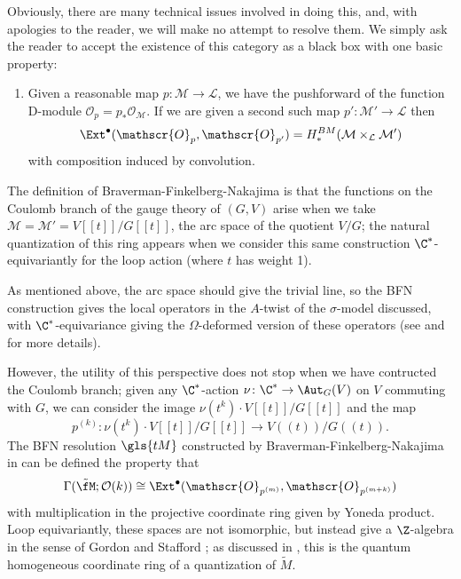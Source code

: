Obviously, there
are many technical issues involved in doing this, and, with apologies
to the reader, we will make no attempt to resolve them.
We simply
ask the reader to accept the existence of this category as a black box
with one basic property:
\begin{enumerate}
\item Given a reasonable map $p\colon \mathcal{M}\to \mathcal{L}$, we
  have the pushforward of the function D-module
  $\mathscr{O}_p=p_*\mathcal{O}_{\mathcal{M}}$.  If we are given a second
  such map $p'\colon \mathcal{M}'\to \mathcal{L}$ then 
  \[\Ext^\bullet(\mathscr{O}_p,
   \mathscr{O}_{p'})=H^{BM}_*(\mathcal{M}\times_{\mathcal{L}}\mathcal{M'})\]
 with composition induced by convolution.  
\end{enumerate}
The definition of Braverman-Finkelberg-Nakajima is that the functions
on the Coulomb branch  of the gauge theory of $(G,V)$ arise when we
take $\mathcal{M}=\mathcal{M}'=V[[t]]/G[[t]]$, the arc space of the
quotient $V/G$; the natural quantization of this ring
appears when we consider this same construction $\C^*$-equivariantly for the
loop action (where $t$ has weight 1).
\begin{physics}
  As mentioned above, the arc space should give the trivial line, so
  the BFN construction gives the local operators in the $A$-twist of
  the $\sigma$-model discussed, with $\C^*$-equivariance giving the
  $\Omega$-deformed version of these operators (see \cite{NaCoulomb}
  and \cite[\S
  1.3]{BBBDN} for more details).
\end{physics}



However, the utility of this perspective does not stop when we have
contructed the Coulomb branch; given any $\C^*$-action $\nu\colon \C^*
\to \Aut_G(V)$ on $V$
commuting with $G$, we can consider the image $\nu(t^k)\cdot
V[[t]]/G[[t]]$ and the map \[p^{(k)}\colon \nu(t^k)\cdot
V[[t]]/G[[t]]\to V((t))/G((t)).\]  The
BFN resolution $\gls{tM}$ constructed by
Braverman-Finkelberg-Nakajima in \cite{BFNline} can be defined  the
property that \[\Gamma(\tilde{\fM}; \mathcal{O}(k))\cong
  \Ext^\bullet(\mathscr{O}_{p^{(m)}}, \mathscr{O}_{p^{(m+k)}})\] with
multiplication in the projective coordinate ring given by Yoneda
product.  
 Loop equivariantly, these spaces are not isomorphic, but instead give a $\Z$-algebra
in the sense of Gordon and Stafford \cite{GS}; as discussed in
\cite[\S 5.2]{BLPWquant}, this is the quantum homogeneous coordinate
ring of a quantization of $\tilde{M}$.



